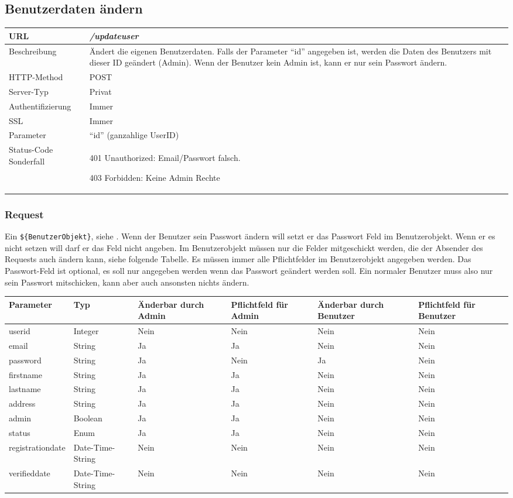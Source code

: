 \documentclass[ngerman,titlepage,parskip=true]{scrartcl}
\newcommand{\requestURL}[1]{\textit{#1}}
\newcommand{\request}[9]
{\subsection{#1}
\begin{tabular}{|p{0.2\textwidth}|p{0.7\textwidth}|}
\hline
  URL & \requestURL{#2}\\\hline
    Beschreibung & #3\\\hline
  HTTP-Method & #4\\\hline
  Server-Typ & #5\\\hline
  Authentifizierung & #6\\\hline
  SSL & #7\\\hline
  Parameter & #8\\\hline
  Status-Code Sonderfall & #9\\\hline
 \end{tabular}\vspace*{1em}}
{}%
{}%
{}%
{}%
{}%
{}%
{}%
{}%
\begin{document}
\request{Benutzerdaten ändern}%
{/updateuser}%
{Ändert die eigenen Benutzerdaten. Falls der Parameter ``id'' angegeben ist, werden die Daten des Benutzers mit dieser ID geändert (Admin). Wenn der Benutzer kein Admin ist, kann er nur sein Passwort ändern.}%
{POST}%
{Privat}%
{Immer}%
{Immer}%
{``id'' (ganzahlige UserID)}%
{401 Unauthorized: Email/Passwort falsch.\par
 403 Forbidden: Keine Admin Rechte}%
\subsubsection{Request}
Ein \texttt{\$\{BenutzerObjekt\}}, siehe .
Wenn der Benutzer sein Passwort ändern will setzt er das Passwort Feld im Benutzerobjekt. Wenn er es nicht setzen will darf er das Feld nicht angeben. Im Benutzerobjekt müssen nur die Felder mitgeschickt werden, die der Absender des Requests auch ändern kann, siehe folgende Tabelle. Es müssen immer alle Pflichtfelder im Benutzerobjekt angegeben werden. Das Passwort-Feld ist optional, es soll nur angegeben werden wenn das Passwort geändert werden soll. Ein normaler Benutzer muss also nur sein Passwort mitschicken, kann aber auch ansonsten nichts ändern. 

	\begin{tabular}{|p{}|p{}|p{}|p{}|p{}|p{}|}
	\hline
	Parameter 			& Typ 		& Änderbar durch Admin & Pflichtfeld für Admin & Änderbar durch Benutzer & Pflichtfeld für Benutzer \\\hline
	userid 				& Integer 			& Nein & Nein 	& Nein & Nein\\
	email 				& String 			& Ja   & Ja 	& Nein & Nein\\
	password 			& String 			& Ja   & Nein 	& Ja   & Nein\\
	firstname 			& String 			& Ja   & Ja 	& Nein & Nein\\
	lastname 			& String 			& Ja   & Ja 	& Nein & Nein\\
	address 			& String 			& Ja   & Ja 	& Nein & Nein\\
	admin 				& Boolean 			& Ja   & Ja 	& Nein & Nein\\
	status 				& Enum	 			& Ja   & Ja 	& Nein & Nein\\
	registrationdate 	& Date-Time-String 	& Nein & Nein 	& Nein & Nein\\
	verifieddate 		& Date-Time-String 	& Nein & Nein	& Nein & Nein\\
	\hline
	\end{tabular}
\end{document}
